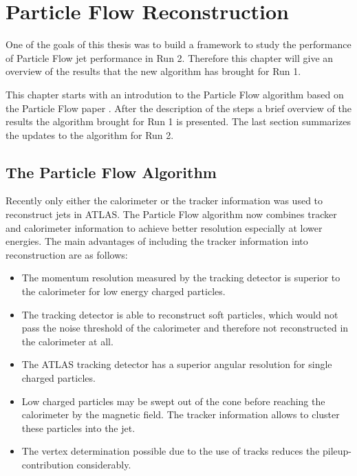 \chapter{Particle Flow Reconstruction}

One of the goals of this thesis was to build a framework to study the performance of Particle Flow jet performance in Run 2. Therefore this chapter will give an overview of the results that the new algorithm has brought for Run 1.

This chapter starts with an introdution to the Particle Flow algorithm based on the Particle Flow paper \cite{pflow16}. After the description of the steps a brief overview of the results the algorithm brought for Run 1 is presented. The last section summarizes the updates to the algorithm for Run 2.

\section{The Particle Flow Algorithm}

Recently only either the calorimeter or the tracker information was used to reconstruct jets in ATLAS. The Particle Flow algorithm now combines tracker and calorimeter information to achieve better resolution especially at lower energies. The main advantages of including the tracker information into reconstruction are as follows:


\begin{itemize}
\item The momentum resolution measured by the tracking detector is superior to the calorimeter for low energy charged particles.
\item The tracking detector is able to reconstruct soft particles, which would not pass the noise threshold of the calorimeter and therefore not reconstructed in the calorimeter at all.
\item The ATLAS tracking detector has a superior angular resolution for single charged particles.
\item Low \pT charged particles may be swept out of the cone before reaching the calorimeter by the magnetic field. The tracker information allows to cluster these particles into the jet.
\item The vertex determination possible due to the use of tracks reduces the pileup-contribution considerably.
\end{itemize}

